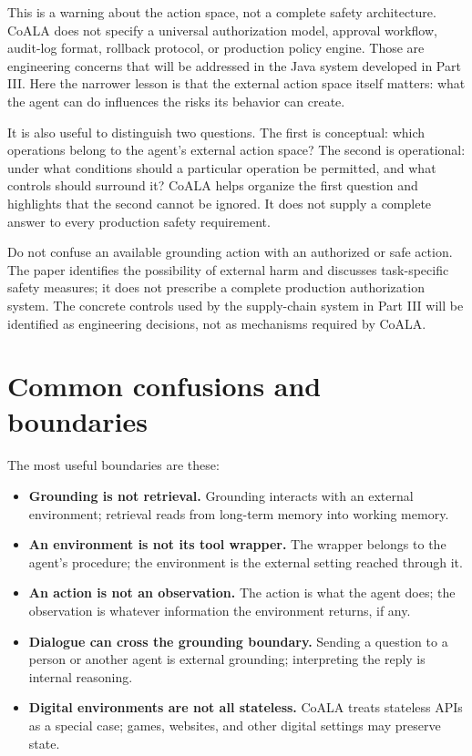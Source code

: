 This is a warning about the action space, not a complete safety architecture. CoALA does not specify a universal authorization model, approval workflow, audit-log format, rollback protocol, or production policy engine. Those are engineering concerns that will be addressed in the Java system developed in Part III. Here the narrower lesson is that the external action space itself matters: what the agent can do influences the risks its behavior can create.

It is also useful to distinguish two questions. The first is conceptual: which operations belong to the agent's external action space? The second is operational: under what conditions should a particular operation be permitted, and what controls should surround it? CoALA helps organize the first question and highlights that the second cannot be ignored. It does not supply a complete answer to every production safety requirement.

\begin{warningbox}
Do not confuse an available grounding action with an authorized or safe action. The paper identifies the possibility of external harm and discusses task-specific safety measures; it does not prescribe a complete production authorization system. The concrete controls used by the supply-chain system in Part III will be identified as engineering decisions, not as mechanisms required by CoALA.
\end{warningbox}

\section{Common confusions and boundaries}
\label{sec:grounding-boundaries}

The most useful boundaries are these:

\begin{itemize}
  \item \textbf{Grounding is not retrieval.} Grounding interacts with an external environment; retrieval reads from long-term memory into working memory.
  \item \textbf{An environment is not its tool wrapper.} The wrapper belongs to the agent's procedure; the environment is the external setting reached through it.
  \item \textbf{An action is not an observation.} The action is what the agent does; the observation is whatever information the environment returns, if any.
  \item \textbf{Dialogue can cross the grounding boundary.} Sending a question to a person or another agent is external grounding; interpreting the reply is internal reasoning.
  \item \textbf{Digital environments are not all stateless.} CoALA treats stateless APIs as a special case; games, websites, and other digital settings may preserve state.
\end{itemize}

